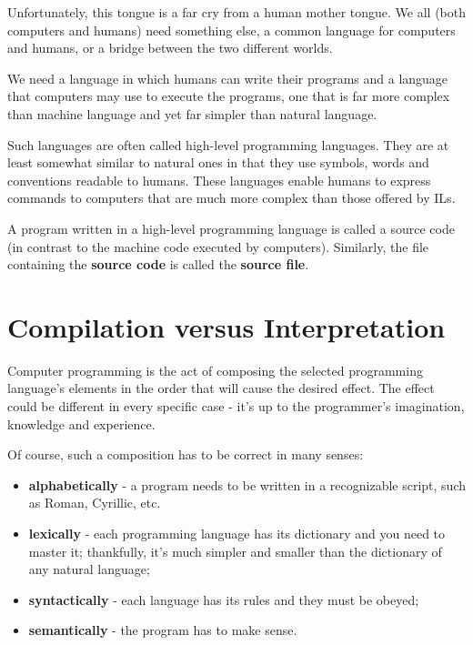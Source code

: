 \documentclass[a4paper,10pt]{article}
\begin{document}
Unfortunately, this tongue is a far cry from a human mother tongue. We all (both computers and humans) need something else, a common language for computers and humans, or a bridge between the two different worlds.
\newline

We need a language in which humans can write their programs and a language that computers may use to execute the programs, one that is far more complex than machine language and yet far simpler than natural language.
\newline

Such languages are often called high-level programming languages. They are at least somewhat similar to natural ones in that they use symbols, words and conventions readable to humans. These languages enable humans to express commands to computers that are much more complex than those offered by ILs.
\newline

A program written in a high-level programming language is called a source code (in contrast to the machine code executed by computers). Similarly, the file containing the \textbf{source code} is called the \textbf{source file}.

\section{Compilation versus Interpretation}
Computer programming is the act of composing the selected programming language's elements in the order that will cause the desired effect. The effect could be different in every specific case - it's up to the programmer's imagination, knowledge and experience.
\newline

Of course, such a composition has to be correct in many senses:
\begin{itemize}
 \item \textbf{alphabetically} - a program needs to be written in a recognizable script, such as Roman, Cyrillic, etc.
 \item \textbf{lexically} - each programming language has its dictionary and you need to master it; thankfully, it's much simpler and smaller than the dictionary of any natural language;
 \item \textbf{syntactically} - each language has its rules and they must be obeyed;
 \item \textbf{semantically} - the program has to make sense.
\end{itemize}
\end{document}

